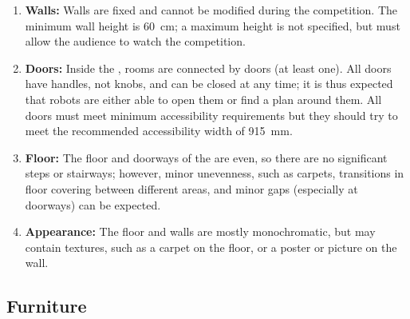 \begin{enumerate}
	\item \textbf{Walls:} Walls are fixed and cannot be modified during the competition. The minimum wall height is \SI{60}{\centi\meter}; a maximum height is not specified, but must allow the audience to watch the competition.
	\item \textbf{Doors:} Inside the \Arena{}, rooms are connected by doors (at least one). All doors have handles, not knobs, and can be closed at any time; it is thus expected that robots are either able to open them or find a plan around them. All doors must meet minimum accessibility requirements but they should try to meet the recommended accessibility width of \SI{915}{\milli\meter}.
	\item \textbf{Floor:} The floor and doorways of the \Arena{} are even, so there are no significant steps or stairways; however, minor unevenness, such as carpets, transitions in floor covering between different areas, and minor gaps (especially at doorways) can be expected.
	\item \textbf{Appearance:} The floor and walls are mostly monochromatic, but may contain textures, such as a carpet on the floor, or a poster or picture on the wall.
\end{enumerate}


\subsection{Furniture}\label{rule:scenario_furniture}

